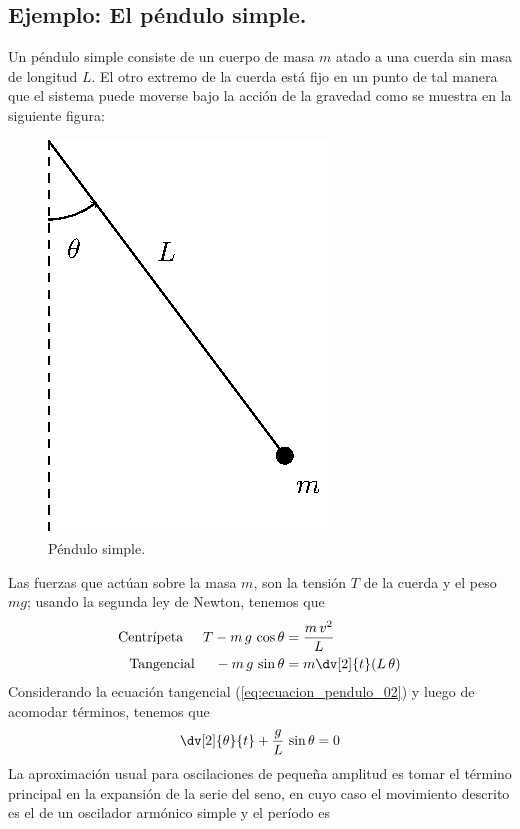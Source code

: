 \subsection{Ejemplo: El péndulo simple.}
Un péndulo simple consiste de un cuerpo de masa $m$ atado a una cuerda sin masa de longitud $L$. El otro extremo de la cuerda está fijo en un punto de tal manera que el sistema puede moverse bajo la acción de la gravedad como se muestra en la siguiente figura:
\begin{figure}[H]
    \centering
    \includegraphics[scale=1.3]{Imagenes/pendulo_01.eps}
    \caption{Péndulo simple.}
\end{figure}
Las fuerzas que actúan sobre la masa $m$, son la tensión $T$ de la cuerda y el peso $mg$; usando la segunda ley de Newton, tenemos que
\begin{align}
\text{Centrípeta} \hspace{0.5cm} T - m \, g \, \cos \theta &= \dfrac{m \, v^{2}}{L}  \label{eq:ecuacion_pendulo_01} \\
\text{Tangencial} \hspace{0.5cm} -m \, g \, \sin \theta &= m \dv[2]{t} (L \, \theta) \label{eq:ecuacion_pendulo_02}
\end{align}
Considerando la ecuación tangencial (\ref{eq:ecuacion_pendulo_02}) y luego de acomodar términos, tenemos que
\begin{equation} \dv[2]{\theta}{t} + \dfrac{g}{L} \, \sin \theta = 0
\label{eq:ecuacion_pendulo_03}
\end{equation}
La aproximación usual para oscilaciones de pequeña amplitud es tomar el término principal en la expansión de la serie del seno, en cuyo caso el movimiento descrito es el de un oscilador armónico simple y el período es
